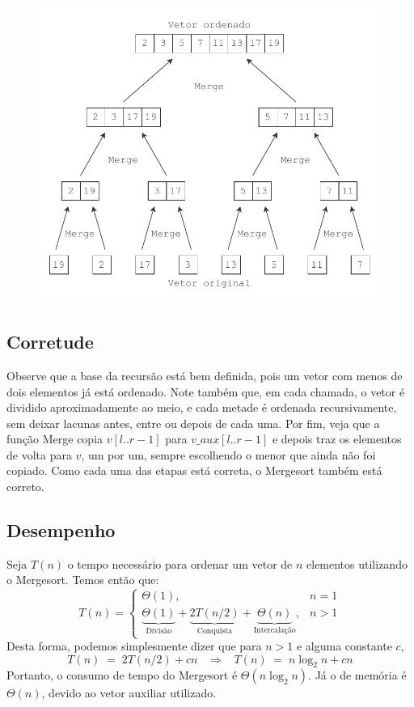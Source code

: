 

\begin{figure}[H]
\centering
\includegraphics[scale=1.0]{figuras/pdf/mergesort.pdf}
\end{figure}

\subsection*{Corretude}
Observe que a base da recursão está bem definida, pois um vetor com menos de dois elementos já está ordenado. Note também que, em cada chamada, o vetor é dividido aproximadamente ao meio, e cada metade é ordenada recursivamente, sem deixar lacunas antes, entre ou depois de cada uma. Por fim, veja que a função Merge copia $v[l..r - 1]$ para $v\_aux[l..r - 1]$ e depois traz os elementos de volta para $v$, um por um, sempre escolhendo o menor que ainda não foi copiado. Como cada uma das etapas está correta, o Mergesort também está correto.

\subsection*{Desempenho}
Seja $T(n)$ o tempo necessário para ordenar um vetor de $n$ elementos utilizando o Mergesort. Temos então que:
\[
  T(n) = 
  \begin{cases}
      \Theta(1),              & n = 1    \\
      \underbrace{\Theta(1)}_{\text{Divisão}} + \underbrace{2T(n/2)}_{\text{Conquista}} + \underbrace{\Theta(n)}_{\text{Intercalação}}, & n > 1 
  \end{cases}
\]
Desta forma, podemos simplesmente dizer que para $n > 1$ e alguma constante $c$,
\[
  T(n) \;=\; 2T(n/2) + cn \;\;\;\Rightarrow\;\;\; T(n) \;=\; n\log_2 n + cn
\]
Portanto, o consumo de tempo do Mergesort é $\Theta(n\log_2 n)$. Já o de memória é $\Theta(n)$, devido ao vetor auxiliar utilizado.
